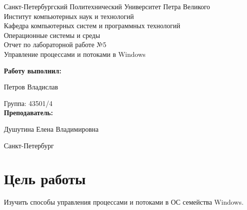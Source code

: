\documentclass[a4paper]{article}
\begin{document}
\begin{titlepage} %

\begin{center} %

\large Санкт-Петербургский Политехнический Университет Петра Великого\\
\large Институт компьютерных наук и технологий \\
\large Кафедра компьютерных систем и программных технологий\\[6cm]

\huge Операционные системы и среды\\[0.5cm]
\large Отчет по лабораторной работе №5\\[0.1cm]
\large Управление процессами и потоками в Windows\\[5cm]
\end{center}

\begin{flushright}
\begin{minipage}{0.5\textwidth}
\begin{flushright}
\textbf{Работу выполнил:}

Петров Владислав

{Группа:} 43501/4\\


\textbf{Преподаватель:} 

Душутина Елена Владимировна
\end{flushright}
\end{minipage} %
\end{flushright} %

\vfill %

\begin{center}

\large Санкт-Петербург\\
\large \the\year %

\end{center} %

\thispagestyle{empty} %
\end{titlepage} %

\vfill %


\section{Цель работы}
	Изучить способы управления процессами и потоками в ОС семейства Windows.
\end{document}
